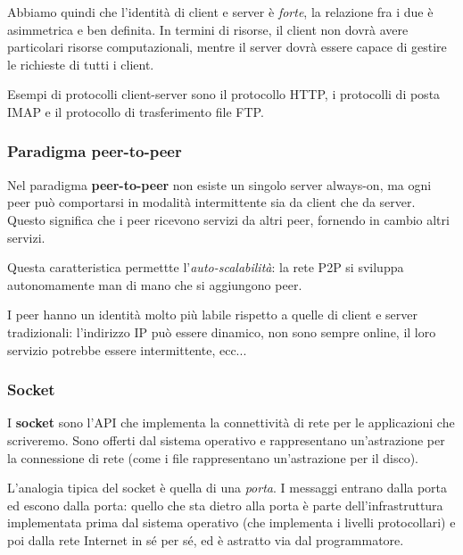 \documentclass[a4paper,11pt]{article}
\begin{document}
Abbiamo quindi che l'identità di client e server è \textit{forte}, la relazione fra i due è asimmetrica e ben definita.
In termini di risorse, il client non dovrà avere particolari risorse computazionali, mentre il server dovrà essere capace di gestire le richieste di tutti i client.

Esempi di protocolli client-server sono il protocollo HTTP, i protocolli di posta IMAP e il protocollo di trasferimento file FTP. 

\subsubsection{Paradigma peer-to-peer}
Nel paradigma \textbf{peer-to-peer} non esiste un singolo server always-on, ma ogni peer può comportarsi in modalità intermittente sia da client che da server.
Questo significa che i peer ricevono servizi da altri peer, fornendo in cambio altri servizi.

Questa caratteristica permettte l'\textit{auto-scalabilità}: la rete P2P si sviluppa autonomamente man di mano che si aggiungono peer.

I peer hanno un identità molto più labile rispetto a quelle di client e server tradizionali: l'indirizzo IP può essere dinamico, non sono sempre online, il loro servizio potrebbe essere intermittente, ecc...

\subsubsection{Socket}
I \textbf{socket} sono l'API che implementa la connettività di rete per le applicazioni che scriveremo. Sono offerti dal sistema operativo e rappresentano un'astrazione per la connessione di rete (come i file rappresentano un'astrazione per il disco).

L'analogia tipica del socket è quella di una \textit{porta}.
I messaggi entrano dalla porta ed escono dalla porta: quello che sta dietro alla porta è parte dell'infrastruttura implementata prima dal sistema operativo (che implementa i livelli protocollari) e poi dalla rete Internet in sé per sé, ed è astratto via dal programmatore.
\end{document}
